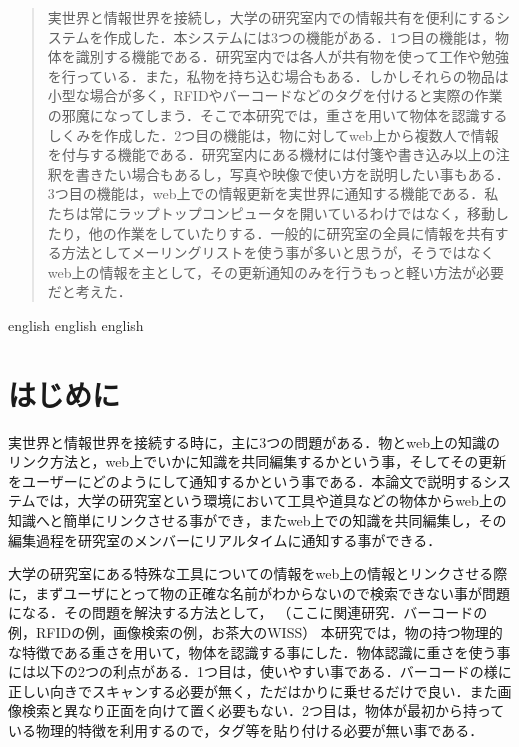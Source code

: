 
\begin{abstract}
実世界と情報世界を接続し，大学の研究室内での情報共有を便利にするシステムを作成した．本システムには3つの機能がある．1つ目の機能は，物体を識別する機能である．研究室内では各人が共有物を使って工作や勉強を行っている．また，私物を持ち込む場合もある．しかしそれらの物品は小型な場合が多く，RFIDやバーコードなどのタグを付けると実際の作業の邪魔になってしまう．そこで本研究では，重さを用いて物体を認識するしくみを作成した．2つ目の機能は，物に対してweb上から複数人で情報を付与する機能である．研究室内にある機材には付箋や書き込み以上の注釈を書きたい場合もあるし，写真や映像で使い方を説明したい事もある．3つ目の機能は，web上での情報更新を実世界に通知する機能である．私たちは常にラップトップコンピュータを開いているわけではなく，移動したり，他の作業をしていたりする．一般的に研究室の全員に情報を共有する方法としてメーリングリストを使う事が多いと思うが，そうではなくweb上の情報を主として，その更新通知のみを行うもっと軽い方法が必要だと考えた．
\end{abstract}

\begin{eabstract}
english english english
\end{eabstract}

\maketitle

\section{はじめに}\label{sec:Introduction}
実世界と情報世界を接続する時に，主に3つの問題がある．物とweb上の知識のリンク方法と，web上でいかに知識を共同編集するかという事，そしてその更新をユーザーにどのようにして通知するかという事である．本論文で説明するシステムでは，大学の研究室という環境において工具や道具などの物体からweb上の知識へと簡単にリンクさせる事ができ，またweb上での知識を共同編集し，その編集過程を研究室のメンバーにリアルタイムに通知する事ができる．

大学の研究室にある特殊な工具についての情報をweb上の情報とリンクさせる際に，まずユーザにとって物の正確な名前がわからないので検索できない事が問題になる．その問題を解決する方法として，
（ここに関連研究．バーコードの例，RFIDの例，画像検索の例，お茶大のWISS）
本研究では，物の持つ物理的な特徴である重さを用いて，物体を認識する事にした．物体認識に重さを使う事には以下の2つの利点がある．1つ目は，使いやすい事である．バーコードの様に正しい向きでスキャンする必要が無く，ただはかりに乗せるだけで良い．また画像検索と異なり正面を向けて置く必要もない．2つ目は，物体が最初から持っている物理的特徴を利用するので，タグ等を貼り付ける必要が無い事である．

